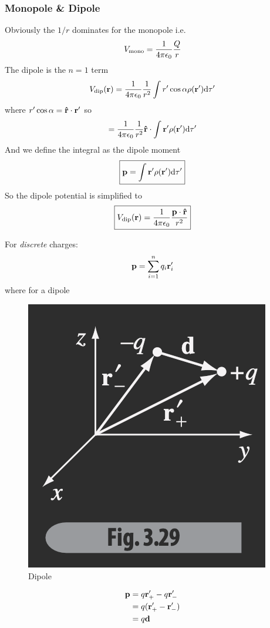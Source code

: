 \documentclass[../main.tex]{subfiles}
\begin{document}
\subsubsection{Monopole \& Dipole}

Obviously the $1/r$ dominates for the monopole i.e.
\begin{align*}
    V_\text{mono} = \frac{1}{4\pi\epsilon_0} \frac{Q}{r}
\end{align*}
The dipole is the $n=1$ term
\begin{align*}
    V_\text{dip}(\vb r) = \frac{1}{4\pi\epsilon_0} \frac{1}{r^2} \int r' \cos\alpha \rho(\vb r') \dd\tau'
\end{align*}
where $r'\cos\alpha = \vu r \cdot \vb r'$ so
\begin{align*}
    = \frac{1}{4\pi\epsilon_0} \frac{1}{r^2} \vu r \cdot \int \vb r' \rho(\vb r') \dd\tau'
\end{align*}
And we define the integral as the dipole moment
\begin{align*}
    \boxed{
        \vb p = \int \vb r' \rho(\vb r') \dd\tau'
    }
\end{align*}
So the dipole potential is simplified to
\begin{align*}
    \boxed{
        V_\text{dip}(\vb r) = \frac{1}{4\pi\epsilon_0} \frac{\vb p \cdot \vu r}{r^2}
    }
\end{align*}

For \textit{discrete} charges:
\begin{align*}
    \vb p = \sum_{i=1}^n q_i \vb r_i'
\end{align*}
where for a dipole 
\begin{figure}[ht]
    \centering
    \includegraphics[width=0.3\linewidth]{fig3_29.png}
    \caption{Dipole}
    \label{fig:lecture3_29}
\end{figure}
\begin{align*}
    \vb p &= q \vb r_+' - q \vb r_-' \\
    &= q(\vb r_+' - \vb r_-') \\
    &= q \vb d
\end{align*}
\end{document}

